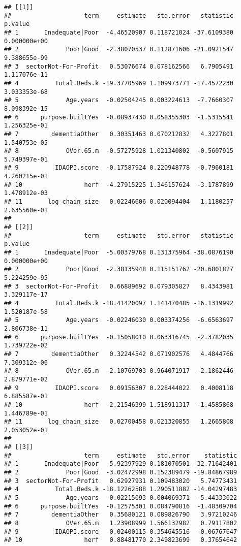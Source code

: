\documentclass[]{article}
\begin{document}
\begin{verbatim}
## [[1]]
##                    term     estimate   std.error   statistic      p.value
## 1       Inadequate|Poor  -4.46520907 0.118721024 -37.6109380 0.000000e+00
## 2             Poor|Good  -2.38070537 0.112871606 -21.0921547 9.388655e-99
## 3  sectorNot-For-Profit   0.53076674 0.078162566   6.7905491 1.117076e-11
## 4          Total.Beds.k -19.37705969 1.109973771 -17.4572230 3.033353e-68
## 5             Age.years  -0.02504245 0.003224613  -7.7660307 8.098392e-15
## 6      purpose.builtYes  -0.08937430 0.058355303  -1.5315541 1.256325e-01
## 7         dementiaOther   0.30351463 0.070212832   4.3227801 1.540753e-05
## 8             OVer.65.m  -0.57275928 1.021340802  -0.5607915 5.749397e-01
## 9          IDAOPI.score  -0.17587924 0.220948778  -0.7960181 4.260215e-01
## 10                 herf  -4.27915225 1.346157624  -3.1787899 1.478912e-03
## 11       log_chain_size   0.02246606 0.020094404   1.1180257 2.635560e-01
## 
## [[2]]
##                    term     estimate   std.error   statistic      p.value
## 1       Inadequate|Poor  -5.00379768 0.131375964 -38.0876190 0.000000e+00
## 2             Poor|Good  -2.38135948 0.115151762 -20.6801827 5.224259e-95
## 3  sectorNot-For-Profit   0.66889692 0.079305827   8.4343981 3.329117e-17
## 4          Total.Beds.k -18.41420097 1.141470485 -16.1319992 1.520187e-58
## 5             Age.years  -0.02246030 0.003374256  -6.6563697 2.806738e-11
## 6      purpose.builtYes  -0.15058010 0.063316745  -2.3782035 1.739722e-02
## 7         dementiaOther   0.32244542 0.071902576   4.4844766 7.309312e-06
## 8             OVer.65.m  -2.10769703 0.964071917  -2.1862446 2.879771e-02
## 9          IDAOPI.score   0.09156307 0.228444022   0.4008118 6.885587e-01
## 10                 herf  -2.21546399 1.518911317  -1.4585868 1.446789e-01
## 11       log_chain_size   0.02700458 0.021320855   1.2665808 2.053052e-01
## 
## [[3]]
##                    term     estimate   std.error    statistic
## 1       Inadequate|Poor  -5.92397929 0.181070501 -32.71642401
## 2             Poor|Good  -3.02472998 0.152389479 -19.84867989
## 3  sectorNot-For-Profit   0.62927931 0.109483020   5.74773431
## 4          Total.Beds.k -18.12262588 1.290511882 -14.04297483
## 5             Age.years  -0.02215093 0.004069371  -5.44333022
## 6      purpose.builtYes  -0.12575301 0.084790816  -1.48309704
## 7         dementiaOther   0.35680121 0.089826790   3.97210246
## 8             OVer.65.m   1.23908999 1.566132982   0.79117802
## 9          IDAOPI.score  -0.02400115 0.354645516  -0.06767647
## 10                 herf   0.88481770 2.349823699   0.37654642

\end{verbatim}
\end{document}
